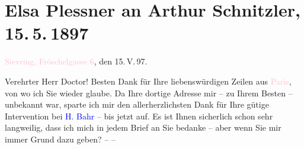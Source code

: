 

\renewcommand{\erwaehntePersonen}{Personen: Hermann Bahr, Elsa Plessner}
\renewcommand{\erwaehnteInstitutionen}{Institutionen: Bazar de la Charité, Leopold Weiss}
\renewcommand{\erwaehnteOrte}{Orte: Fröschelgasse 6, Leipzig, London, Paris, Sievering, Wien}
\renewcommand{\erwaehnteWerke}{Werke: Der gläserne Käfig. Eine Parabel, Der gläserne Käfig. Skizzen und Novellen, Meine Freundin Klothilde}
\section[Elsa Plessner an Arthur Schnitzler, 15. 5. 1897]{Elsa Plessner an Arthur Schnitzler, 15. 5. 1897}
\nopagebreak{}
\rehead{ }\normalsize\beginnumbering{}
\toendnotes[C]{\smallbreak\pagebreak[2]}
\toendnotes[C]{\smallbreak}
\pstart
           {\pb}\textcolor{pink}{Sievring, Fröschelgasse 6}{}\ledrightnote{\textcolor{pink}{Fröschelgasse 6}}, den 15. V. 97.\pend
           
\pstart\center{}Verehrter Herr Doctor!\pend\vspace{0.5em}
\pstart
           Besten Dank für Ihre liebenswürdigen Zeilen aus \textcolor{pink}{Paris}{}\ledrightnote{\textcolor{pink}{Paris}}, von wo ich Sie wieder \label{K_L03695-1v}\label{} glaube.
               Da Ihre dortige Adresse mir – zu Ihrem Besten – unbekannt war, sparte ich mir den
               allerherzlichsten Dank für Ihre gütige Intervention bei \textcolor{blue}{H. Bahr}{}\ledrightnote{\textcolor{blue}{Hermann Bahr}} – bis jetzt auf. Es ist Ihnen sicherlich schon sehr
               langweilig, dass ich mich in jedem Brief an Sie bedanke – aber wenn Sie mir immer
               Grund dazu geben? – –\pend
           
